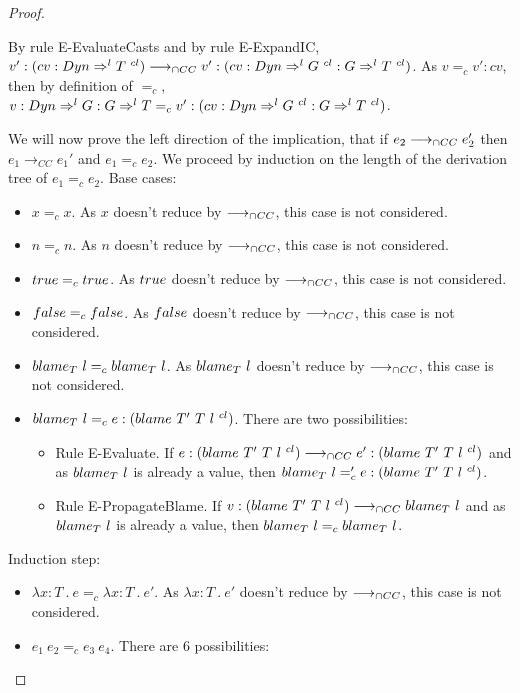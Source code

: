 \documentclass[a4paper]{article}
\begin{document}
\begin{proof}
\begin{itemize}
\begin{itemize}
        By rule E-EvaluateCasts and by rule E-ExpandIC, $v' : (cv : Dyn \Rightarrow^l T\ ^{cl}) \longrightarrow_{\cap CC} v' : (cv : Dyn \Rightarrow^l G\ ^{cl} : G \Rightarrow^l T\ ^{cl})$.
        As $v =_c v' : cv$, then by definition of $=_c$, $v : \Dyn \Rightarrow^l G : G \Rightarrow^l T =_c v' : (cv : \Dyn \Rightarrow^l G\ ^{cl} : G \Rightarrow^l T\ ^{cl})$.
    \end{itemize}
\end{itemize}
We will now prove the left direction of the implication, that if $e_2 \longrightarrow_{\cap CC} e_2'$ then $e_1 \longrightarrow_{CC} e_1'$ and $e_1 =_{c} e_2$.
We proceed by induction on the length of the derivation tree of $e_1 =_c e_2$.
Base cases:
\begin{itemize}
    \item $x =_c x$.
    As $x$ doesn't reduce by $\longrightarrow_{\cap CC}$, this case is not considered.
    \item $n =_c n$.
    As $n$ doesn't reduce by $\longrightarrow_{\cap CC}$, this case is not considered.
    \item $true =_c true$.
    As $true$ doesn't reduce by $\longrightarrow_{\cap CC}$, this case is not considered.
    \item $false =_c false$.
    As $false$ doesn't reduce by $\longrightarrow_{\cap CC}$, this case is not considered.
    \item $blame_{T}\ l =_c blame_{T}\ l$.
    As $blame_{T}\ l$ doesn't reduce by $\longrightarrow_{\cap CC}$, this case is not considered.
    \item $blame_{T}\ l =_c e : (blame\ T'\ T\ l\ ^{cl})$.
    There are two possibilities:
    \begin{itemize}
        \item Rule E-Evaluate.
        If $e : (blame\ T'\ T\ l\ ^{cl}) \longrightarrow_{\cap CC} e' : (blame\ T'\ T\ l\ ^{cl})$ and as $blame_{T}\ l$ is already a value, then $blame_{T}\ l =_c 'e : (blame\ T'\ T\ l\ ^{cl})$.
        \item Rule E-PropagateBlame.
        If $v : (blame\ T'\ T\ l\ ^{cl}) \longrightarrow_{\cap CC} blame_{T}\ l$ and as $blame_{T}\ l$ is already a value, then $blame_{T}\ l =_c blame_{T}\ l$.
    \end{itemize}
\end{itemize}
Induction step:
\begin{itemize}
    \item $\lambda x : T\ .\ e =_c \lambda x : T\ .\ e'$.
    As $\lambda x : T\ .\ e'$ doesn't reduce by $\longrightarrow_{\cap CC}$, this case is not considered.
    \item $e_1\ e_2 =_c e_3\ e_4$.
    There are 6 possibilities:
    \begin{itemize}

\end{itemize}
\end{itemize}
\end{proof}
\end{document}
